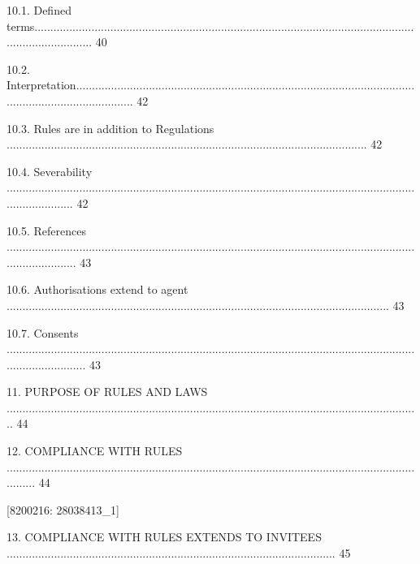 \documentclass{article}
\begin{document}
{\fontsize{9.99}{1}10.1. Defined terms................................................................................................................................................... 40 }

{\fontsize{9.99}{1}10.2. Interpretation................................................................................................................................................... 42 }

{\fontsize{9.99}{1}10.3. Rules are in addition to Regulations .................................................................................................................. 42 }

{\fontsize{9.99}{1}10.4. Severability ...................................................................................................................................................... 42 }

{\fontsize{9.99}{1}10.5. References ....................................................................................................................................................... 43 }

{\fontsize{9.99}{1}10.6. Authorisations extend to agent ......................................................................................................................... 43 }

{\fontsize{9.99}{1}10.7. Consents .......................................................................................................................................................... 43 }

{\fontsize{9.99}{1}11. PURPOSE OF RULES AND LAWS ................................................................................................................................... 44 }

{\fontsize{9.99}{1}12. COMPLIANCE WITH RULES .......................................................................................................................................... 44 }

\newpage
















{\fontsize{7.02}{1}[8200216: 28038413\_1] }

{\fontsize{9.99}{1}13. COMPLIANCE WITH RULES EXTENDS TO INVITEES ........................................................................................................ 45 }
\end{document}
